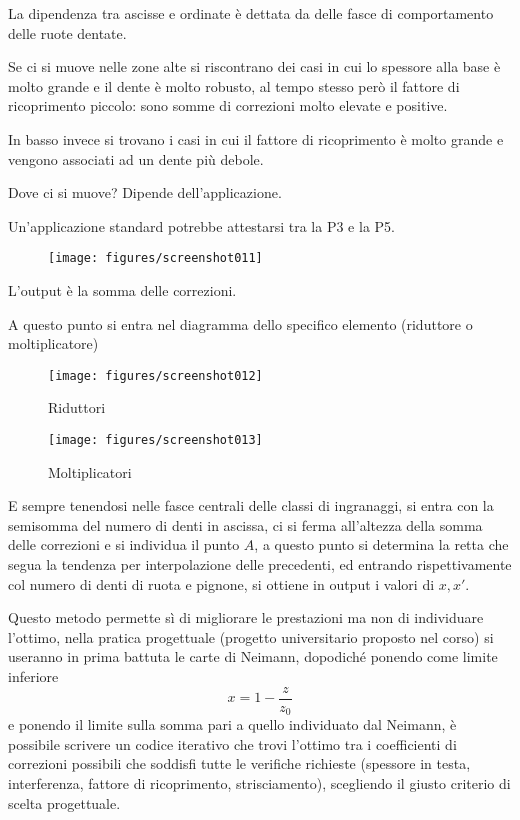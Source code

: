 \documentclass[a4paper, 15pt]{article}
\begin{document}
\begin{adjustwidth}{2in}{}
La dipendenza tra ascisse e ordinate è dettata da  delle fasce di comportamento delle ruote dentate. \newline

Se ci si muove nelle zone alte si riscontrano dei casi in cui lo spessore alla base è molto grande   e il dente è molto robusto, al tempo stesso però il fattore di ricoprimento piccolo: sono  somme di correzioni molto elevate e positive. \newline 

In basso invece si trovano i casi in cui il fattore di ricoprimento è molto grande e vengono associati ad un dente più debole. \newline 

Dove ci si muove? Dipende dell'applicazione. 

Un'applicazione standard potrebbe attestarsi tra la P3 e la P5.
\begin{figure}[H]
	\centering
	\texttt{[image: figures/screenshot011]}
	\label{fig:screenshot011}
\end{figure}
L'output è la somma delle correzioni. \newline 

A questo punto si entra nel diagramma dello specifico elemento (riduttore o moltiplicatore) 
\begin{figure}[H]
	\centering
	\texttt{[image: figures/screenshot012]}
	\caption{Riduttori}
	\label{fig:screenshot012}
\end{figure}
\begin{figure}[H]
	\centering
	\texttt{[image: figures/screenshot013]}
	\caption{Moltiplicatori}
	\label{fig:screenshot013}
\end{figure}
E sempre tenendosi nelle fasce centrali delle classi di ingranaggi, si entra con la semisomma  del numero di denti in ascissa, ci si ferma all'altezza della  somma delle correzioni e si individua il punto $A$, a questo punto  si determina la retta che segua la tendenza  per interpolazione delle precedenti, ed entrando rispettivamente col numero di denti di ruota e pignone, si ottiene in output i valori di $x, x'$. \newline 

Questo metodo permette sì di migliorare le prestazioni ma non di individuare l'ottimo, nella pratica progettuale (progetto universitario proposto nel corso) si useranno in prima battuta le carte di Neimann, dopodiché ponendo come limite inferiore 
\[x = 1 - \dfrac{z}{z_0} \]
e ponendo il limite sulla somma pari a quello individuato dal Neimann, è possibile scrivere un codice iterativo che trovi l'ottimo tra i coefficienti di correzioni possibili che soddisfi tutte le verifiche richieste (spessore in testa, interferenza, fattore di ricoprimento, strisciamento), scegliendo il giusto criterio di scelta progettuale.
\end{adjustwidth}
\newpage
\end{document}
